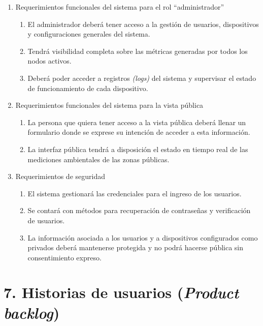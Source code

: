\documentclass[
11pt, %
]{charter}
\begin{document}
\begin{enumerate}
\begin{enumerate}
	\end{enumerate}

	\item Requerimientos funcionales del sistema para el rol “administrador”
	\begin{enumerate}
		\item El administrador deberá tener acceso a la gestión de usuarios, dispositivos y configuraciones generales del sistema.
		\item Tendrá visibilidad completa sobre las métricas generadas por todos los nodos activos.
		\item Deberá poder acceder a registros \textit{(logs)} del sistema y supervisar el estado de funcionamiento de cada dispositivo.

	\end{enumerate}

	\item Requerimientos funcionales del sistema para la vista pública
	\begin{enumerate}
		\item La persona que quiera tener acceso a la vista pública deberá llenar un formulario donde se exprese su intención de acceder a esta información.
		\item La interfaz pública tendrá a disposición el estado en tiempo real de las mediciones ambientales de las zonas públicas.

	\end{enumerate}

	\item Requerimientos de seguridad
	\begin{enumerate}
		\item El sistema gestionará las credenciales para el ingreso de los usuarios.
		\item Se contará con métodos para recuperación de contraseñas y verificación de usuarios.
		\item La información asociada a los usuarios y a dispositivos configurados como privados deberá mantenerse protegida y no podrá hacerse pública sin consentimiento expreso.

	\end{enumerate}

\end{enumerate}

\section{7. Historias de usuarios (\textit{Product backlog})}
\label{sec:backlog}
\end{document}
